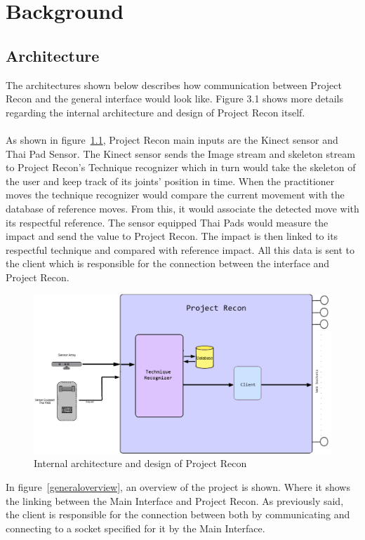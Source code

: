 \chapter{Background}\label{chap:background}
\section{Architecture}
The architectures shown below describes how communication between Project Recon and the general interface would look like. Figure 3.1 shows more details regarding the internal architecture and design of Project Recon itself.
\\
\\
As shown in figure~\ref{projectrecondiagram}, Project Recon main inputs are the Kinect sensor and Thai Pad Sensor. The Kinect sensor sends the Image stream and skeleton stream to Project Recon's Technique recognizer which in turn would take the skeleton of the user and keep track of its joints' position in time. When the practitioner moves the technique recognizer would compare the current movement with the database of reference moves. From this, it would associate the detected move with its respectful reference. The sensor equipped Thai Pads would measure the impact and send the value to Project Recon. The impact is then linked to its respectful technique and compared with reference impact. All this data is sent to the client which is responsible for the connection between the interface and Project Recon.
\begin{figure}[!htbp]
\centering
\includegraphics[width=1\textwidth]{images/project_Recon_diagram.png}
\caption{Internal architecture and design of Project Recon}
\label{projectrecondiagram}
\end{figure}

In figure~\ref{generaloverview}, an overview of the project is shown. Where it shows the linking between the Main Interface and Project Recon. As previously said, the client is responsible for the connection between both by communicating and connecting to a socket specified for it by the Main Interface.

